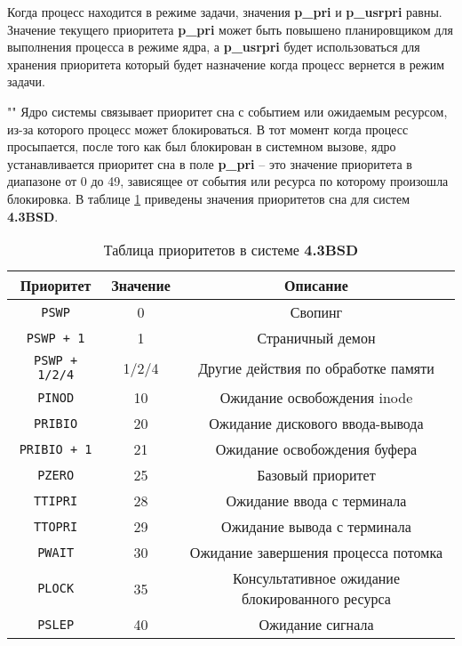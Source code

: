 \noindent Когда процесс находится в режиме задачи, значения \textbf{p\_pri} и \textbf{p\_usrpri} равны. Значение текущего приоритета \textbf{p\_pri} может быть повышено планировщиком для выполнения процесса в режиме ядра, а \textbf{p\_usrpri} будет использоваться для хранения приоритета который будет назначение когда процесс вернется в режим задачи.

""\newline 
\noindent Ядро системы связывает приоритет сна с событием или ожидаемым ресурсом, из-за которого процесс может блокироваться. В тот момент когда процесс просыпается, после того как был блокирован в системном вызове, ядро устанавливается приоритет сна в поле \textbf{p\_pri} -- это значение приоритета в диапазоне от 0 до 49, зависящее от события или ресурса по которому произошла блокировка. В таблице \ref{tab:bsd} приведены значения приоритетов сна для систем \textbf{4.3BSD}.


\begin{table}[h]
    \caption{Таблица приоритетов в системе \textbf{4.3BSD}}
    \label{tab:bsd}
    \begin{center}
        \begin{tabular}{ |c|c|c|  }
            \hline
            \textbf{Приоритет} & \textbf{Значение} & \textbf{Описание} \\
            \hline
            \texttt{PSWP} & 0 & Свопинг \\
            \hline
            \texttt{PSWP + 1} & 1 & Страничный демон \\
            \hline
            \texttt{PSWP + 1/2/4} & 1/2/4 & Другие действия по обработке памяти \\
            \hline
            \texttt{PINOD} & 10 & Ожидание освобождения inode \\
            \hline
            \texttt{PRIBIO} & 20 & Ожидание дискового ввода-вывода \\
            \hline
            \texttt{PRIBIO + 1} & 21 & Ожидание освобождения буфера \\
            \hline
            \texttt{PZERO} & 25 & Базовый приоритет \\
            \hline
            \texttt{TTIPRI} & 28 & Ожидание ввода с терминала \\
            \hline
            \texttt{TTOPRI} & 29 & Ожидание вывода с терминала \\
            \hline 
            \texttt{PWAIT} & 30 & Ожидание завершения процесса потомка \\
            \hline
            \texttt{PLOCK} & 35 & Консультативное ожидание блокированного ресурса \\
            \hline
            \texttt{PSLEP} & 40 & Ожидание сигнала \\
            \hline
        \end{tabular}
    \end{center}
\end{table}

